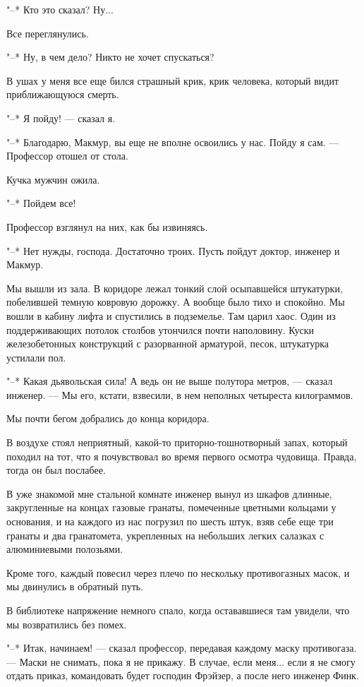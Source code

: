"--* Кто это сказал? Ну...

Все переглянулись.

"--* Ну, в чем дело? Никто не хочет спускаться?

В ушах у меня все еще бился страшный крик, крик человека, который видит
приближающуюся смерть.

"--* Я пойду! --- сказал я.

"--* Благодарю, Макмур, вы еще не вполне освоились у нас. Пойду я  сам.  ---
Профессор отошел от стола.

Кучка мужчин ожила.

"--* Пойдем все!

Профессор взглянул на них, как бы извиняясь.

"--* Нет нужды, господа. Достаточно троих. Пусть пойдут доктор, инженер  и
Макмур.

Мы вышли из зала. В коридоре лежал тонкий слой осыпавшейся  штукатурки,
побелившей темную ковровую дорожку. А вообще  было  тихо  и  спокойно.  Мы
вошли в кабину лифта и спустились в подземелье. Там царил  хаос.  Один  из
поддерживающих  потолок  столбов   утончился   почти   наполовину.   Куски
железобетонных конструкций  с  разорванной  арматурой,  песок,  штукатурка
устилали пол.

"--* Какая дьявольская сила! А ведь он не выше полутора метров,  ---  сказал
инженер. --- Мы его, кстати, взвесили, в нем неполных четыреста килограммов.

Мы почти бегом добрались до конца коридора.

В  воздухе  стоял  неприятный,  какой-то  приторно-тошнотворный  запах,
который походил на тот,  что  я  почувствовал  во  время  первого  осмотра
чудовища. Правда, тогда он был послабее.

В уже знакомой мне стальной комнате инженер вынул  из  шкафов  длинные,
закругленные на концах газовые гранаты,  помеченные  цветными  кольцами  у
основания, и на каждого из нас погрузил по шесть штук, взяв себе  еще  три
гранаты и два гранатомета, укрепленных  на  небольших  легких  салазках  с
алюминиевыми полозьями.

Кроме того, каждый  повесил  через  плечо  по  нескольку  противогазных
масок, и мы двинулись в обратный путь.

В библиотеке напряжение немного спало, когда остававшиеся там  увидели,
что мы возвратились без помех.

"--*  Итак,  начинаем!  ---  сказал  профессор,  передавая   каждому   маску
противогаза. --- Маски не снимать, пока я не прикажу. В случае, если меня...
если я не смогу отдать приказ, командовать будет господин Фрэйзер, а после
него инженер Финк.

